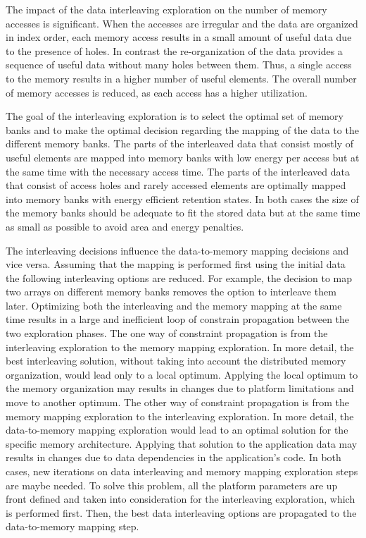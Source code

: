 The impact of the data interleaving exploration on the number of memory accesses is significant.
When the accesses are irregular and the data are organized in index order, each memory access results in a small amount of useful data due to the presence of holes.
In contrast the re-organization of the data provides a sequence of useful data without many holes between them.
Thus, a single access to the memory results in a higher number of useful elements.
The overall number of memory accesses is reduced, as each access has a higher utilization.

The goal of the interleaving exploration is to select the optimal set of memory banks and to make  the optimal decision regarding the mapping of the data to the different memory banks.
The parts of the interleaved data that consist mostly of useful elements are mapped into memory banks with low energy per access but at the same time with the necessary access time.
The parts of the interleaved data that consist of access holes and rarely accessed elements are optimally mapped into memory banks with energy efficient retention states.
In both cases the size of  the memory banks should be adequate to fit the stored data but at the same time as small as possible to avoid area and energy penalties.

The interleaving decisions influence the data-to-memory mapping decisions and vice versa.
Assuming that the mapping is performed first using the initial data the following interleaving options are reduced.
For example, the decision to map two arrays on different memory banks removes the option to interleave them later.
Optimizing both the interleaving and the memory mapping at the same time results in a large and inefficient loop of constrain propagation between the two exploration phases.
The one way of constraint propagation is from the interleaving exploration to the memory mapping exploration.
In more detail, the best interleaving solution, without taking into account the distributed memory organization, would lead only to a local optimum.
Applying the local optimum to the memory organization may results in changes due to platform limitations and move to another optimum.
The other way of constraint propagation is from the memory mapping exploration to the interleaving exploration.
In more detail, the data-to-memory mapping exploration would lead to an optimal solution for the specific memory architecture.
Applying that solution to the application data may results in changes due to data dependencies in the application's code.
In both cases, new iterations on data interleaving and memory mapping exploration steps are maybe needed.
To solve this problem, all the platform parameters are up front defined and taken into consideration for the interleaving exploration, which is performed first.
Then, the best data interleaving options are propagated to the data-to-memory mapping step.

